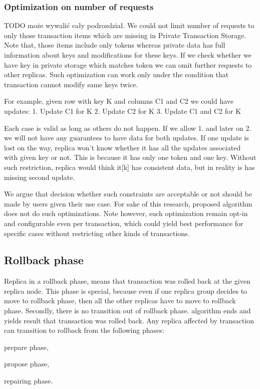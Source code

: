 \subsubsection{Optimization on number of requests}
TODO może wywalić cały podrozdział.
We could not limit number of requests to only those transaction items which are missing in Private Transaction Storage. Note that, those items include only tokens whereas private data has full information about keys and modifications for these keys. If we check whether we have key in private storage which matches token we can omit further requests to other replicas. 
Such optimization can work only under the condition that transaction cannot modify same keys twice. 


For example, given row with key K and columns C1 and C2 we could have updates:
1. Update C1 for K
2. Update C2 for K
3. Update C1 and C2 for K


Each case is valid as long as others do not happen. If we allow 1. and later on 2. we will not have any guarantees to have data for both updates. If one update is lost on the way, replica won’t know whether it has all the updates associated with given key or not. This is because it has only one token and one key. 
Without such restriction, replica would think it[k] has consistent data, but in reality is has missing second update.

 We argue that decision whether such constraints are acceptable or not should be made by users given their use case. For sake of this research, proposed algorithm does not do such optimizations. Note however, such optimization remain opt-in and configurable even per transaction, which could yield best performance for specific cases without restricting other kinds of transactions.
       

\subsection{Rollback phase}
Replica in a rollback phase, means that transaction was rolled back at the given replica node. 
This phase is special, because even if one replica group decides to move to rollback phase, then all the other replicas have to move to rollback phase. Secondly, there is no transition out of rollback phase. \mpt algorithm ends and yields result that transaction was rolled back.
Any replica affected by transaction can transition to rollback  from the following phases: \begin{enumerate*}
\item prepare phase,
\item propose phase,
\item repairing phase.
\end{enumerate*}

